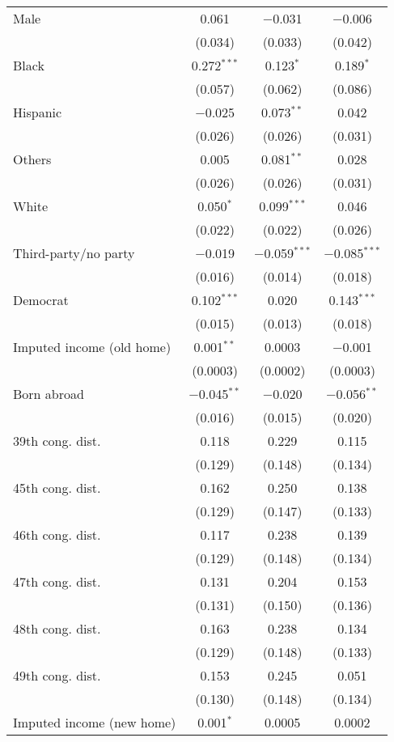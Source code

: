 \begin{tabular}{@{\extracolsep{5pt}}lccc}
  Male & 0.061 & $-$0.031 & $-$0.006 \\ 
  & (0.034) & (0.033) & (0.042) \\ 
  Black & 0.272$^{***}$ & 0.123$^{*}$ & 0.189$^{*}$ \\ 
  & (0.057) & (0.062) & (0.086) \\ 
  Hispanic & $-$0.025 & 0.073$^{**}$ & 0.042 \\ 
  & (0.026) & (0.026) & (0.031) \\ 
  Others & 0.005 & 0.081$^{**}$ & 0.028 \\ 
  & (0.026) & (0.026) & (0.031) \\ 
  White & 0.050$^{*}$ & 0.099$^{***}$ & 0.046 \\ 
  & (0.022) & (0.022) & (0.026) \\ 
  Third-party/no party & $-$0.019 & $-$0.059$^{***}$ & $-$0.085$^{***}$ \\ 
  & (0.016) & (0.014) & (0.018) \\ 
  Democrat & 0.102$^{***}$ & 0.020 & 0.143$^{***}$ \\ 
  & (0.015) & (0.013) & (0.018) \\ 
  Imputed income (old home) & 0.001$^{**}$ & 0.0003 & $-$0.001 \\ 
  & (0.0003) & (0.0002) & (0.0003) \\ 
  Born abroad & $-$0.045$^{**}$ & $-$0.020 & $-$0.056$^{**}$ \\ 
  & (0.016) & (0.015) & (0.020) \\ 
  39th cong. dist. & 0.118 & 0.229 & 0.115 \\ 
  & (0.129) & (0.148) & (0.134) \\ 
  45th cong. dist. & 0.162 & 0.250 & 0.138 \\ 
  & (0.129) & (0.147) & (0.133) \\ 
  46th cong. dist. & 0.117 & 0.238 & 0.139 \\ 
  & (0.129) & (0.148) & (0.134) \\ 
  47th cong. dist. & 0.131 & 0.204 & 0.153 \\ 
  & (0.131) & (0.150) & (0.136) \\ 
  48th cong. dist. & 0.163 & 0.238 & 0.134 \\ 
  & (0.129) & (0.148) & (0.133) \\ 
  49th cong. dist. & 0.153 & 0.245 & 0.051 \\ 
  & (0.130) & (0.148) & (0.134) \\ 
  Imputed income (new home) & 0.001$^{*}$ & 0.0005 & 0.0002 \\ 

\end{tabular}
